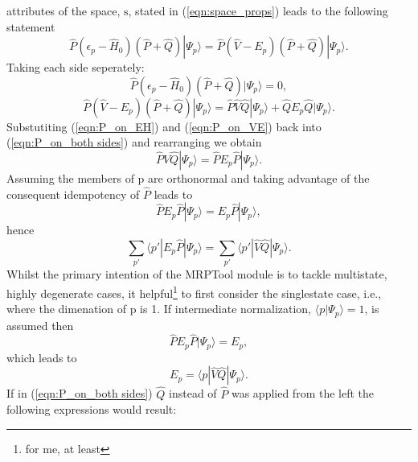 \documentclass[12pt]{article}
\begin{document}
attributes of the space, $\mathrm{s}$, stated in (\ref{eqn:space_props}) leads to the following statement
\begin{equation}
\hat{P}(\epsilon_{p} - \hat{H}_{0})(\hat{P}+\hat{Q})| \Psi_{p} \rangle  =  \hat{P}(\hat{V}-E_{p})(\hat{P}+\hat{Q})|\Psi_{p} \rangle .
\label{eqn:P_on_both sides}
\end{equation}
Taking each side seperately:
\begin{equation}
\hat{P}(\epsilon_{p} - \hat{H}_{0})(\hat{P}+\hat{Q})| \Psi_{p} \rangle  = 0  ,
\label{eqn:P_on_EH}
\end{equation}
\begin{equation}
\hat{P}(\hat{V}-E_{p})(\hat{P}+\hat{Q})|\Psi_{p} \rangle = \hat{P}\hat{V}\hat{Q}|\Psi_{p} \rangle + \hat{Q}E_{p}\hat{Q}|\Psi_{p}\rangle .
\label{eqn:P_on_VE}
\end{equation}
Substutiting (\ref{eqn:P_on_EH}) and (\ref{eqn:P_on_VE}) back into (\ref{eqn:P_on_both sides}) and rearranging we obtain
\begin{equation}
\hat{P}\hat{V}\hat{Q}|\Psi_{p} \rangle =  \hat{P}E_{p}\hat{P}|\Psi_{p}\rangle .
\label{eqn:pt_energy}
\end{equation}
Assuming the members of $\mathrm{p}$ are orthonormal and taking advantage of the consequent idempotency of $\hat{P}$ leads to
\begin{equation}
\hat{P}E_{p}\hat{P}|\Psi_{p}\rangle = E_{p}\hat{P}|\Psi_{p} \rangle ,
\end{equation}
hence
\begin{equation}
\sum_{p'} \langle p' | E_{p}\hat{P}|\Psi_{p} \rangle  =  \sum_{p'} \langle p' | \hat{V}\hat{Q}|\Psi_{p} \rangle.
\label{eqn:multistate_pt_energy}
\end{equation}
Whilst the primary intention of the MRPTool module is to tackle multistate, highly degenerate cases, it helpful\footnote{for me, at least} 
to first consider the singlestate case, i.e., where the dimenation of $\mathrm{p}$ is 1. 
If intermediate normalization, $\langle p | \Psi_{p} \rangle = 1$, is assumed then 
\begin{equation}
\hat{P}E_{p}\hat{P}|\Psi_{p}\rangle = E_{p},
\end{equation}
which leads to 
\begin{equation}
E_{p} = \langle p | \hat{V}\hat{Q}|\Psi_{p} \rangle.
\label{eqn:singlestate_pt_energy}
\end{equation}
If in (\ref{eqn:P_on_both sides}) $\hat{Q}$ instead of $\hat{P}$ was applied from the left the following expressions would result:
\end{document}
